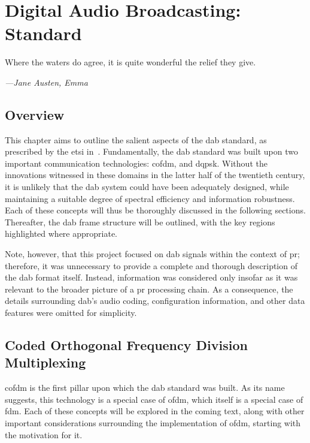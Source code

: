 \documentclass[class=report,11pt,crop=false]{standalone}
\begin{document}
\ifstandalone
\tableofcontents
\fi
\chapter{Digital Audio Broadcasting: Standard}
\epigraph{Where the waters do agree, it is quite wonderful the relief they give.}%
{\emph{---Jane Austen, Emma}}

\section{Overview}
This chapter aims to outline the salient aspects of the \gls{dab} standard, as prescribed by the \gls{etsi} in~\cite{dabstandard}. Fundamentally, the \gls{dab} standard was built upon two important communication technologies: \acrfull{cofdm}, and \acrfull{dqpsk}. Without the innovations witnessed in these domains in the latter half of the twentieth century, it is unlikely that the \gls{dab} system could have been adequately designed, while maintaining a suitable degree of spectral efficiency and information robustness. Each of these concepts will thus be thoroughly discussed in the following sections. Thereafter, the \gls{dab} frame structure will be outlined, with the key regions highlighted where appropriate.

Note, however, that this project focused on \gls{dab} signals within the context of \gls{pr}; therefore, it was unnecessary to provide a complete and thorough description of the \gls{dab} format itself. Instead, information was considered only insofar as it was relevant to the broader picture of a \gls{pr} processing chain. As a consequence, the details surrounding \gls{dab}'s audio coding, configuration information, and other data features were omitted for simplicity.

\section{Coded Orthogonal Frequency Division Multiplexing}
\gls{cofdm} is the first pillar upon which the \gls{dab} standard was built. As its name suggests, this technology is a special case of \gls{ofdm}, which itself is a special case of \gls{fdm}. Each of these concepts will be explored in the coming text, along with other important considerations surrounding the implementation of \gls{ofdm}, starting with the motivation for it.
\end{document}
